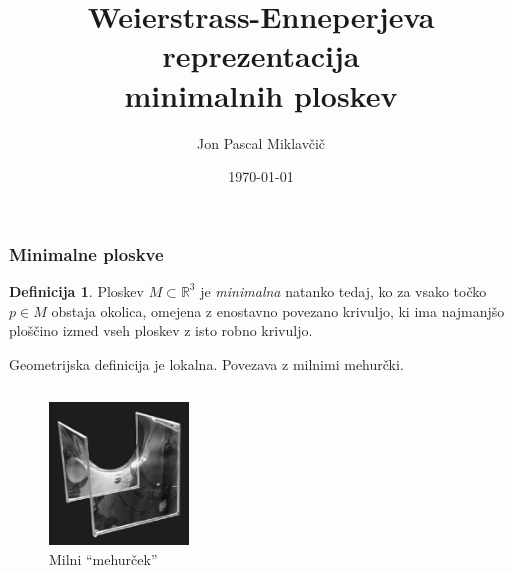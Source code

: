 \documentclass[10pt]{beamer}
\title[Weierstrass-Enneperjeva parametrizacija]{Weierstrass-Enneperjeva reprezentacija\\minimalnih ploskev}
\subtitle{}
\author[Jon Pascal Miklavčič]{Jon Pascal Miklavčič}
\institute[]{Mentor: doc.~dr.~Uroš Kuzman}
\date{\tiny \today}
\theoremstyle{definition}
\newtheorem{definicija}{Definicija}
\theoremstyle{remark}
\theoremstyle{plain}
\numberwithin{equation}{section}  %
\begin{document}
\frame{\titlepage}

\begin{frame}
    \frametitle{Minimalne ploskve}

    \begin{definicija}
        Ploskev $M \subset \mathbb{R}^3$ je \emph{minimalna} natanko tedaj, ko za vsako točko $p \in M$ obstaja okolica, omejena z enostavno povezano krivuljo, ki ima najmanjšo ploščino izmed vseh ploskev z isto robno krivuljo. 
    \end{definicija}

    Geometrijska definicija je lokalna. Povezava z milnimi mehurčki. 

    \begin{columns}[t]
    \begin{column}{0.45\textwidth}
        \centering
        \begin{figure}
            \includegraphics[width=10em]{../Slike/Soap_Film.png}
            \caption{Milni “mehurček”}
            \label{fig:1}
        \end{figure}
    \end{column}

    \begin{column}{0.45\textwidth}
        \centering
        \begin{figure}[H]
            \centering
\end{figure}
\end{column}
\end{columns}
\end{frame}
\end{document}
